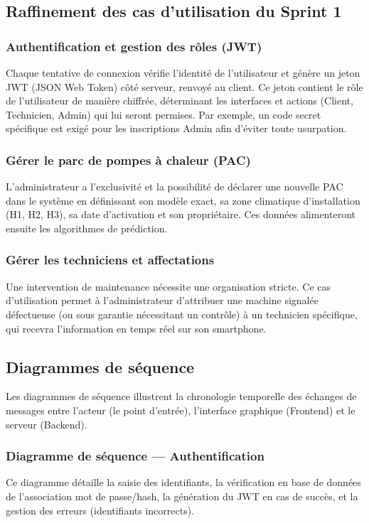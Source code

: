 \documentclass[12pt,a4paper]{report}
\begin{document}
\subsection{Raffinement des cas d'utilisation du Sprint 1}
\subsubsection{Authentification et gestion des rôles (JWT)}
Chaque tentative de connexion vérifie l'identité de l'utilisateur et génère un jeton JWT (JSON Web Token) côté serveur, renvoyé au client. Ce jeton contient le rôle de l'utilisateur de manière chiffrée, déterminant les interfaces et actions (Client, Technicien, Admin) qui lui seront permises. Par exemple, un code secret spécifique est exigé pour les inscriptions Admin afin d'éviter toute usurpation.

\subsubsection{Gérer le parc de pompes à chaleur (PAC)}
L'administrateur a l'exclusivité et la possibilité de déclarer une nouvelle PAC dans le système en définissant son modèle exact, sa zone climatique d'installation (H1, H2, H3), sa date d'activation et son propriétaire. Ces données alimenteront ensuite les algorithmes de prédiction.

\subsubsection{Gérer les techniciens et affectations}
Une intervention de maintenance nécessite une organisation stricte. Ce cas d'utilisation permet à l'administrateur d'attribuer une machine signalée défectueuse (ou sous garantie nécessitant un contrôle) à un technicien spécifique, qui recevra l'information en temps réel sur son smartphone.

\subsection{Diagrammes de séquence}
Les diagrammes de séquence illustrent la chronologie temporelle des échanges de messages entre l'acteur (le point d'entrée), l'interface graphique (Frontend) et le serveur (Backend).

\subsubsection{Diagramme de séquence — Authentification}
Ce diagramme détaille la saisie des identifiants, la vérification en base de données de l'association mot de passe/hash, la génération du JWT en cas de succès, et la gestion des erreurs (identifiants incorrects).
\end{document}

